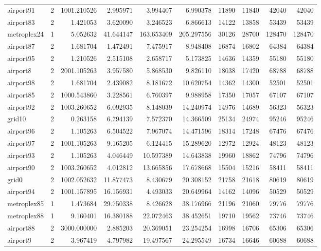 \begin{longtable}{|l|r|r|r|r|r|r|r|r|r|}
airport91 & 2 & 1001.210526 & 2.995971 & 3.994407 & 6.990378 & 11890 & 11840 & 42040 & 42040 \\
airport83 & 2 & 1.421053 & 3.620090 & 3.246523 & 6.866613 & 14122 & 13858 & 53439 & 53439 \\
metroplex24 & 1 & 5.052632 & 41.644147 & 163.653409 & 205.297556 & 30126 & 28700 & 128470 & 128470 \\
airport87 & 2 & 1.681704 & 1.472491 & 7.475917 & 8.948408 & 16874 & 16802 & 64384 & 64384 \\
airport95 & 2 & 1.210526 & 2.515108 & 2.658717 & 5.173825 & 14636 & 14359 & 55180 & 55180 \\
airport8 & 2 & 2001.105263 & 3.957580 & 5.868530 & 9.826110 & 18038 & 17420 & 68788 & 68788 \\
airport98 & 2 & 1.681704 & 2.439082 & 8.181672 & 10.620754 & 14362 & 14300 & 52501 & 52501 \\
airport85 & 2 & 1000.543860 & 3.228561 & 6.760397 & 9.988958 & 17350 & 17057 & 67107 & 67107 \\
airport92 & 2 & 1003.260652 & 6.092935 & 8.148039 & 14.240974 & 14976 & 14689 & 56323 & 56323 \\
grid10 & 2 & 0.263158 & 6.794139 & 7.572370 & 14.366509 & 25134 & 24974 & 95246 & 95246 \\
airport96 & 2 & 1.105263 & 6.504522 & 7.967074 & 14.471596 & 18314 & 17248 & 67476 & 67476 \\
airport97 & 2 & 1001.105263 & 9.165205 & 6.124415 & 15.289620 & 12972 & 12924 & 48123 & 48123 \\
airport93 & 2 & 1.105263 & 4.046449 & 10.597389 & 14.643838 & 19960 & 18862 & 74796 & 74796 \\
airport90 & 2 & 1003.260652 & 4.012812 & 13.665856 & 17.678668 & 15504 & 15216 & 58411 & 58411 \\
grid0 & 2 & 1002.052632 & 11.877473 & 8.430679 & 20.308152 & 21758 & 21618 & 80619 & 80619 \\
airport94 & 2 & 1001.157895 & 16.156931 & 4.493033 & 20.649964 & 14162 & 14096 & 50529 & 50529 \\
metroplex85 & 1 & 1.473684 & 29.750338 & 8.426628 & 38.176966 & 21196 & 21060 & 79776 & 79776 \\
metroplex88 & 1 & 9.160401 & 16.380188 & 22.072463 & 38.452651 & 19710 & 19562 & 73746 & 73746 \\
airport88 & 2 & 3000.000000 & 2.885203 & 20.369051 & 23.254254 & 16998 & 16706 & 65306 & 65306 \\
airport9 & 2 & 3.967419 & 4.797982 & 19.497567 & 24.295549 & 16734 & 16646 & 60688 & 60688 \\

\end{longtable}
